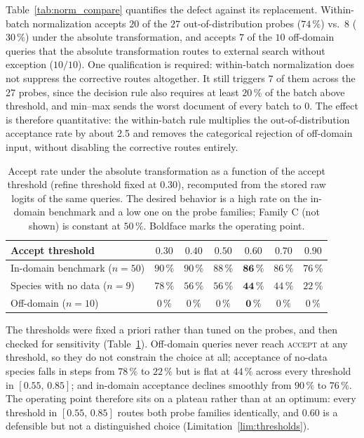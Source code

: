 \documentclass[runningheads]{llncs}
\begin{document}
Table~\ref{tab:norm_compare} quantifies the defect against its replacement. Within-batch
normalization accepts $20$ of the $27$ out-of-distribution probes ($74\,\%$) vs.\ $8$
($30\,\%$) under the absolute transformation, and accepts $7$ of the $10$ off-domain
queries that the absolute transformation routes to external search without exception
($10/10$). One qualification is required: within-batch normalization does not suppress
the corrective routes altogether. It still triggers $7$ of them across the 27 probes,
since the decision rule also requires at least $20\,\%$ of the batch above threshold,
and min--max sends the worst document of every batch to $0$. The effect is therefore
quantitative: the within-batch rule multiplies the out-of-distribution acceptance rate by
about 2.5 and removes the categorical rejection of off-domain input, without disabling
the corrective routes entirely.

\begin{table}[!ht]
\centering
\caption{Accept rate under the absolute transformation as a function of the accept
threshold (refine threshold fixed at $0.30$), recomputed from the stored raw logits of
the same queries. The desired behavior is a high rate on the in-domain benchmark and a
low one on the probe families; Family C (not shown) is constant at $50\,\%$. Boldface
marks the operating point.}
\label{tab:threshold_sweep}
\footnotesize
\begin{tabular}{l c c c c c c}
\toprule
\textbf{Accept threshold} & $0.30$ & $0.40$ & $0.50$ & $\mathbf{0.60}$ & $0.70$ & $0.90$ \\
\midrule
In-domain benchmark ($n{=}50$)      & $90\,\%$ & $90\,\%$ & $88\,\%$ & $\mathbf{86\,\%}$ & $86\,\%$ & $76\,\%$ \\
Species with no data ($n{=}9$)      & $78\,\%$ & $56\,\%$ & $56\,\%$ & $\mathbf{44\,\%}$ & $44\,\%$ & $22\,\%$ \\
Off-domain ($n{=}10$)               & $0\,\%$  & $0\,\%$  & $0\,\%$  & $\mathbf{0\,\%}$  & $0\,\%$  & $0\,\%$ \\
\bottomrule
\end{tabular}
\end{table}

The thresholds were fixed a priori rather than tuned on the probes, and then checked
for sensitivity (Table~\ref{tab:threshold_sweep}). Off-domain queries never reach \textsc{accept} at any threshold, so they do
not constrain the choice at all; acceptance of no-data species falls in steps from
$78\,\%$ to $22\,\%$ but is flat at $44\,\%$ across every threshold in
$[0.55,\,0.85]$; and in-domain acceptance declines smoothly from $90\,\%$ to
$76\,\%$. The operating point therefore sits on a plateau rather than at an optimum:
every threshold in $[0.55,\,0.85]$ routes both probe families identically, and
$0.60$ is a defensible but not a distinguished choice (Limitation~\ref{lim:thresholds}).
\end{document}
